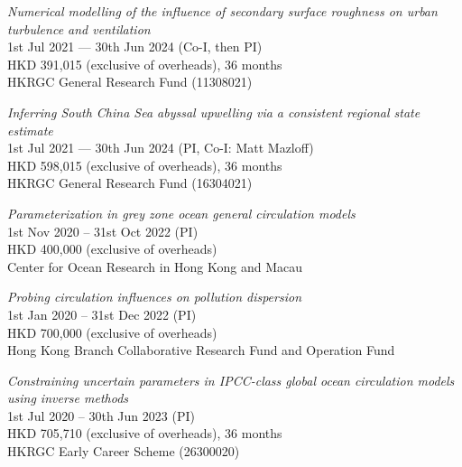 \documentclass[letterpaper]{article}
\renewenvironment{itemize}{
  \begin{list}{}{
    \setlength{\leftmargin}{1.5em}
  }
}{
  \end{list}
}
\begin{document}
\begin{itemize}
\item[--] \textit{Numerical modelling of the influence of secondary surface roughness on urban turbulence and ventilation}\\
1st Jul 2021 --- 30th Jun 2024 (Co-I, then PI)\\
HKD 391,015 (exclusive of overheads), 36 months\\
HKRGC General Research Fund (11308021)

\item[--] \textit{Inferring South China Sea abyssal upwelling via a consistent regional state estimate}\\
1st Jul 2021 --- 30th Jun 2024 (PI, Co-I: Matt Mazloff)\\
HKD 598,015 (exclusive of overheads), 36 months\\
HKRGC General Research Fund (16304021)

\item[--] \textit{Parameterization in grey zone ocean general circulation models}\\
1st Nov 2020 -- 31st Oct 2022 (PI)\\
HKD 400,000 (exclusive of overheads)\\
Center for Ocean Research in Hong Kong and Macau

\item[--] \textit{Probing circulation influences on pollution dispersion}\\
1st Jan 2020 -- 31st Dec 2022 (PI)\\
HKD 700,000 (exclusive of overheads)\\ 
Hong Kong Branch Collaborative Research Fund and Operation Fund

\item[--] \textit{Constraining uncertain parameters in IPCC-class global ocean
circulation models using inverse methods}\\
1st Jul 2020 -- 30th Jun 2023 (PI)\\
HKD 705,710 (exclusive of overheads), 36 months \\
HKRGC Early Career Scheme (26300020)

\end{itemize}


\end{document}
